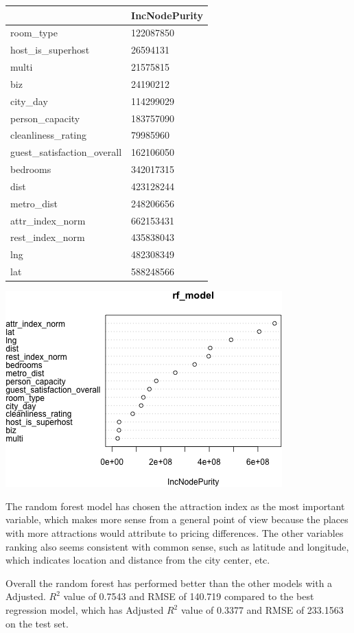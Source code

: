 \documentclass[
]{article}
\begin{document}
\begin{longtable}[]{@{}ll@{}}
\toprule()
& IncNodePurity \\
\midrule()
\endhead
room\_type & 122087850 \\
host\_is\_superhost & 26594131 \\
multi & 21575815 \\
biz & 24190212 \\
city\_day & 114299029 \\
person\_capacity & 183757090 \\
cleanliness\_rating & 79985960 \\
guest\_satisfaction\_overall & 162106050 \\
bedrooms & 342017315 \\
dist & 423128244 \\
metro\_dist & 248206656 \\
attr\_index\_norm & 662153431 \\
rest\_index\_norm & 435838043 \\
lng & 482308349 \\
lat & 588248566 \\
\bottomrule()
\end{longtable}

\includegraphics{c.png}

The random forest model has chosen the attraction index as the most
important variable, which makes more sense from a general point of view
because the places with more attractions would attribute to pricing
differences. The other variables ranking also seems consistent with
common sense, such as latitude and longitude, which indicates location
and distance from the city center, etc.

Overall the random forest has performed better than the other models
with a Adjusted. \(R^2\) value of 0.7543 and RMSE of 140.719 compared to
the best regression model, which has Adjusted \(R^2\) value of 0.3377
and RMSE of 233.1563 on the test set.
\end{document}
